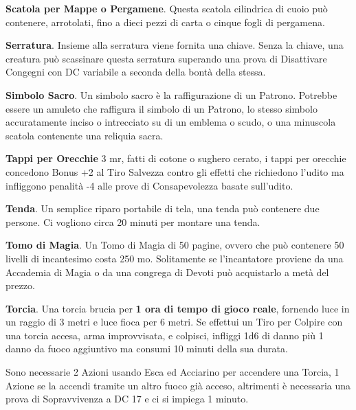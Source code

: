 \begin{multicols}{2}
\textbf{Scatola per Mappe o Pergamene}. Questa scatola cilindrica di cuoio può contenere, arrotolati, fino a dieci pezzi di carta o cinque fogli di pergamena.

\textbf{Serratura}\hypertarget{Serratura}{}. Insieme alla serratura viene fornita una chiave. Senza la chiave, una creatura può scassinare questa serratura superando una prova di Disattivare Congegni con DC variabile a seconda della bontà della stessa.


\textbf{Simbolo Sacro}\label{Simbolo Sacro}. Un simbolo sacro è la raffigurazione di un Patrono. Potrebbe essere un amuleto che raffigura il simbolo di un Patrono, lo stesso simbolo accuratamente inciso o intrecciato su di un emblema o scudo, o una minuscola scatola contenente una reliquia sacra.

\textbf{Tappi per Orecchie} 3 mr, fatti di cotone o sughero cerato, i tappi per orecchie concedono Bonus +2 al Tiro Salvezza contro gli effetti che richiedono l'udito ma infliggono penalità -4 alle prove di Consapevolezza basate sull'udito.

\textbf{Tenda}\label{Tenda}\hypertarget{Tenda}{}. Un semplice riparo portabile di tela, una tenda può contenere due persone. Ci vogliono circa 20 minuti per montare una tenda.

\textbf{Tomo di Magia}. Un Tomo di Magia di 50 pagine, ovvero che può contenere 50 livelli di incantesimo costa 250 mo. Solitamente se l'incantatore proviene da una Accademia di Magia o da una congrega di Devoti può acquistarlo a metà del prezzo.

\textbf{Torcia}\label{Torcia}\hypertarget{Torcia}{}. Una torcia brucia per \textbf{1 ora di tempo di gioco reale}, fornendo luce in un raggio di 3 metri e luce fioca per 6 metri. Se effettui un Tiro per Colpire con una torcia accesa, arma improvvisata, e colpisci, infliggi 1d6 di danno più 1 danno da fuoco aggiuntivo ma consumi 10 minuti della sua durata.

Sono necessarie 2 Azioni usando Esca ed Acciarino per accendere una Torcia, 1 Azione se la accendi tramite un altro fuoco già acceso, altrimenti è necessaria una prova di Sopravvivenza a DC 17 e ci si impiega 1 minuto.


\end{multicols}
